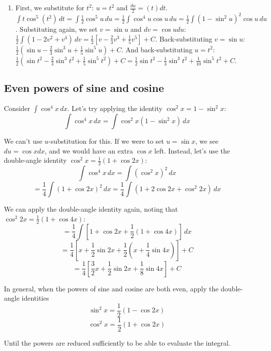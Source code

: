 \begin{Answer}[ref = power_1]
\begin{enumerate}
\item First, we substitute for $t^2$: $u = t^2$ and $\frac{du}{2} = (t)dt$. $
\int t \cos^5{\left( t^2 \right)}\,dt = \int \frac{1}{2}\cos^5{u}\,du = \frac{
1}{2} \int \cos^4{u} \cos{u}\,du = \frac{1}{2} \int \left( 1 - \sin^2{u} 
\right)^2 \cos{u}\,du$. Substituting again, we set $v = \sin{u}$ and $dv = 
\cos{u}du$: $\frac{1}{2} \int \left( 1 - 2v^2 + v^4 \right)\,dv = \frac{1}{2}
\left[ v - \frac{2}{3}v^3 + \frac{1}{5}v^5 \right] + C$. Back-substituting $v =
\sin{u}$: $\frac{1}{2} \left( \sin{u} - \frac{2}{3}\sin^3{u} + \frac{1}{5}\sin^
5{u} \right) + C$. And back-substituting $u = t^2$: $\frac{1}{2} \left( \sin{t^
2} - \frac{2}{3}\sin^3{t^2} + \frac{1}{5}\sin^5{t^2} \right) + C = \frac{1}{2}
\sin{t^2} - \frac{1}{3}\sin^3{t^2} + \frac{1}{10}\sin^5{t^2} + C$.
\end{enumerate}
\end{Answer}

\subsection{Even powers of sine and cosine}
Consider $\int \cos^4{x}\,dx$. Let's try applying the identity $\cos^2{x} = 1 -
\sin^2{x}$:
$$\int \cos^4{x}\,dx = \int \cos^2{x} \left( 1 - \sin^2{x} \right)\,dx$$

We can't use $u$-substitution for this. If we were to set $u = \sin{x}$, we 
see $du = \cos{x} dx$, and we would have an extra $\cos{x}$ left. Instead, 
let's use the double-angle identity $\cos^2{x} = \frac{1}{2} \left( 1 + 
\cos{2x} \right)$:
$$\int \cos^4{x}\,dx = \int \left( \cos^2{x} \right)^2\,dx$$
$$= \frac{1}{4} \int \left( 1 + \cos{2x} \right)^2\,dx = \frac{1}{4} \int 
\left( 1 + 2\cos{2x} + \cos^2{2x} \right)\,dx$$

We can apply the double-angle identity again, noting that $\cos^2{2x} = 
\frac{1}{2} \left( 1 + \cos{4x} \right)$:
$$= \frac{1}{4} \int \left[ 1 + \cos{2x} + \frac{1}{2} \left( 1 + \cos{4x} 
\right) \right]\,dx$$
$$= \frac{1}{4} \left[ x + \frac{1}{2}\sin{2x} + \frac{1}{2} \left( x + 
\frac{1}{4}\sin{4x} \right) \right] + C$$
$$= \frac{1}{4} \left[\frac{3}{2}x + \frac{1}{2}\sin{2x} + \frac{1}{8}\sin{4x} 
\right] + C$$

In general, when the powers of sine and cosine are both even, apply the 
double-angle identities
$$\sin^2{x} = \frac{1}{2} \left( 1 - \cos{2x} \right)$$
$$\cos^2{x} = \frac{1}{2} \left( 1 + \cos{2x} \right)$$

Until the powers are reduced sufficiently to be able to evaluate the integral. 

